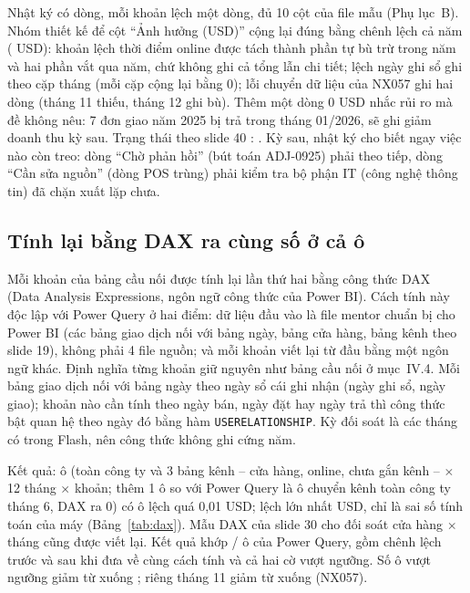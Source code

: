 Nhật ký có \SoNhatKyDong{} dòng, mỗi khoản lệch một dòng, đủ 10 cột của file mẫu (Phụ lục~B). Nhóm thiết kế để cột ``Ảnh hưởng (USD)'' cộng lại đúng bằng chênh lệch cả năm (\SoNhatKyTong{} USD): khoản lệch thời điểm online được tách thành phần tự bù trừ trong năm và hai phần vắt qua năm, chứ không ghi cả tổng lẫn chi tiết; lệch ngày ghi sổ ghi theo cặp tháng (mỗi cặp cộng lại bằng 0); lỗi chuyển dữ liệu của NX057 ghi hai dòng (tháng 11 thiếu, tháng 12 ghi bù). Thêm một dòng 0 USD nhắc rủi ro mà đề không nêu: 7 đơn giao năm 2025 bị trả trong tháng 01/2026, sẽ ghi giảm doanh thu kỳ sau. Trạng thái theo slide 40 \cite{slide_project1}: \SoNhatKyTrangThai{}. Kỳ sau, nhật ký cho biết ngay việc nào còn treo: dòng ``Chờ phản hồi'' (bút toán ADJ-0925) phải theo tiếp, dòng ``Cần sửa nguồn'' (dòng POS trùng) phải kiểm tra bộ phận IT (công nghệ thông tin) đã chặn xuất lặp chưa.

\subsection{Tính lại bằng DAX ra cùng số ở cả \SoDaxO{} ô}

Mỗi khoản của bảng cầu nối được tính lại lần thứ hai bằng công thức DAX (Data Analysis Expressions, ngôn ngữ công thức của Power BI). Cách tính này độc lập với Power Query ở hai điểm: dữ liệu đầu vào là file mentor chuẩn bị cho Power BI (các bảng giao dịch nối với bảng ngày, bảng cửa hàng, bảng kênh theo slide 19), không phải 4 file nguồn; và mỗi khoản viết lại từ đầu bằng một ngôn ngữ khác. Định nghĩa từng khoản giữ nguyên như bảng cầu nối ở mục~IV.4. Mỗi bảng giao dịch nối với bảng ngày theo ngày sổ cái ghi nhận (ngày ghi sổ, ngày giao); khoản nào cần tính theo ngày bán, ngày đặt hay ngày trả thì công thức bật quan hệ theo ngày đó bằng hàm \texttt{USERELATIONSHIP}. Kỳ đối soát là các tháng có trong Flash, nên công thức không ghi cứng năm.

Kết quả: \SoDaxO{} ô (toàn công ty và 3 bảng kênh -- cửa hàng, online, chưa gắn kênh -- $\times$ 12 tháng $\times$ khoản; thêm 1 ô so với Power Query là ô chuyển kênh toàn công ty tháng 6, DAX ra 0) có \SoDaxOLech{} ô lệch quá 0,01 USD; lệch lớn nhất \SoDaxLechMax{} USD, chỉ là sai số tính toán của máy (Bảng~\ref{tab:dax}). Mẫu DAX của slide 30 cho đối soát cửa hàng $\times$ tháng cũng được viết lại. Kết quả khớp \SoDaxCHKhop{}/\SoDaxCHO{} ô của Power Query, gồm chênh lệch trước và sau khi đưa về cùng cách tính và cả hai cờ vượt ngưỡng. Số ô vượt ngưỡng giảm từ \SoDaxCoTruoc{} xuống \SoDaxCoSau{}; riêng tháng 11 giảm từ \SoDaxCoTruocThangMuoiMot{} xuống \SoDaxCoSauThangMuoiMot{} (NX057).

